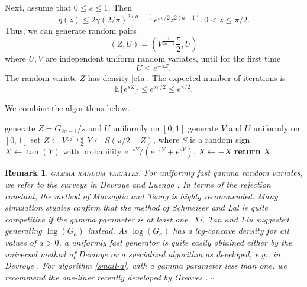 \documentclass[12pt,reqno,tbtags]{amsart}
\newcommand{\EXP}{\mathbb{E}}
\newcommand{\inlaw}{\buildrel {\mathcal L} \over =}
\newtheorem{remark}{Remark}
\begin{document}
Next, assume that $0 \le s \le 1$. Then
$$
\eta (z) \le 2\gamma (2/\pi)^{2(a-1)} e^{s\pi/2} z^{2(a-1)} ,  0 < z \le \pi/2.
$$
Thus, we can generate random pairs 
$$
(Z,U) = \left( V^{\frac{1}{2a-1}} \frac{\pi}{2} , U  \right)
$$
where $U, V$ are independent uniform random variates, until for the first time
$$
U \le e^{-s Z}.
$$
The random variate $Z$ has density \eqref{eta}.
The expected number of iterations is
$$
\EXP \{ e^{sZ} \} \le e^{s\pi/2} \le e^{\pi/2}.
$$

We combine the algorithms below.

\begin{algorithm}[H]
\caption{PearsonIV generator for parameter $a \in (1/2, 1].$}\label{small-a}
\begin{algorithmic}[1]
\Repeat
\State generate $Z = G_{2a-1}/s$ and $U$ uniformly on $[0,1]$ 
\Else
\Repeat
\State generate $V$ and $U$ uniformly on $[0,1]$ 
\State set $Z \leftarrow  V^{\frac{1}{2a-1}} \frac{\pi}{2}$
\EndIf
\State $Y \gets  S(\pi/2 -Z) $, where $S$ is a random sign 
\State $X \gets \tan ( Y ) $ 
\State with probability $e^{-sY}/(e^{-sY} + e^{sY})$, $X \gets -X$ 
\State \textbf{return} $X$ 
\Comment {$X \inlaw P_{a,s}$}
\end{algorithmic}
\end{algorithm}




\begin{remark}
\textsc{gamma random variates.}
For uniformly fast gamma random variates, we refer to the surveys
in Devroye \cite{D5} and Luengo \cite{Lu}. In terms of the rejection constant,
the method of Marsaglia and Tsang \cite{Marsaglia+Tsang}
is highly recommended. Many simulation studies confirm
that the method of Schmeiser and Lal \cite{SL} is quite
competitive if the gamma parameter is at least one. Xi, Tan and Liu
\cite{Xi} suggested generating $\log (G_a)$ instead. As $\log (G_a)$
has a log-concave density for all values of $a > 0$, a uniformly
fast generator is quite easily obtained either by the universal
method of Devroye \cite{D4} or a specialized algorithm as developed, e.g.,
in Devroye \cite{D8}.
For algorithm \ref{small-a}, with a gamma parameter less than one, we recommend the one-liner recently developed by Greaves \cite{greaves2026extended}. $\square$
\end{remark}

\end{document}
